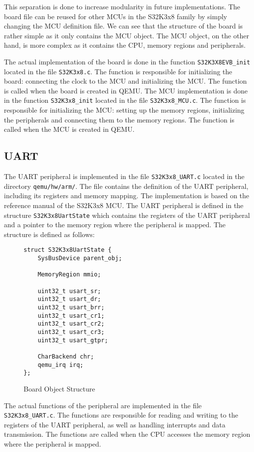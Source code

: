 This separation is done to increase modularity in future implementations. The board file can be reused for other MCUs in the S32K3x8 family by simply changing the MCU definition file.
We can see that the structure of the board is rather simple as it only contains the MCU object. The MCU object, on the other hand, is more complex as it contains the CPU, memory regions and peripherals.

The actual implementation of the board is done in the function \texttt{S32K3X8EVB\_init} located in the file \texttt{S32K3x8.c}. The function is responsible for initializing the board: connecting the clock to the MCU and initializing the MCU. The function is called when the board is created in QEMU.
The MCU implementation is done in the function \texttt{S32K3x8\_init} located in the file \texttt{S32K3x8\_MCU.c}. The function is responsible for initializing the MCU: setting up the memory regions, initializing the peripherals and connecting them to the memory regions. The function is called when the MCU is created in QEMU.

\subsection{UART}

The UART peripheral is implemented in the file \texttt{S32K3x8\_UART.c} located in the directory \texttt{qemu/hw/arm/}. The file contains the definition of the UART peripheral, including its registers and memory mapping. The implementation is based on the reference manual of the S32K3x8 MCU.
The UART peripheral is defined in the structure \texttt{S32K3x8UartState} which contains the registers of the UART peripheral and a pointer to the memory region where the peripheral is mapped. The structure is defined as follows:
\begin{figure}
    \begin{verbatim}
struct S32K3x8UartState {
    SysBusDevice parent_obj;

    MemoryRegion mmio;

    uint32_t usart_sr;
    uint32_t usart_dr;
    uint32_t usart_brr;
    uint32_t usart_cr1;
    uint32_t usart_cr2;
    uint32_t usart_cr3;
    uint32_t usart_gtpr;

    CharBackend chr;
    qemu_irq irq;
};
    \end{verbatim}
    \caption{Board Object Structure}
    \label{fig:UART_structure}
\end{figure}

The actual functions of the peripheral are implemented in the file \texttt{S32K3x8\_UART.c}. The functions are responsible for reading and writing to the registers of the UART peripheral, as well as handling interrupts and data transmission. The functions are called when the CPU accesses the memory region where the peripheral is mapped.

